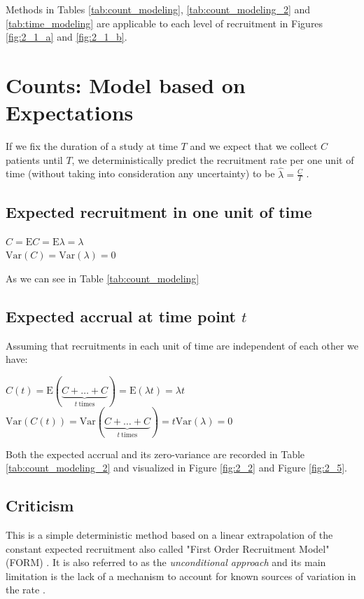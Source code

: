 Methods in Tables \ref{tab:count_modeling}, \ref{tab:count_modeling_2} and \ref{tab:time_modeling} are applicable to each level of recruitment in Figures \ref{fig:2_1_a} and \ref{fig:2_1_b}.


\section{Counts: Model based on Expectations}
\label{sec:expect}

If we fix the duration of a study at time $T$ and we expect that we collect $C$ patients until $T$, we deterministically predict the recruitment rate per one unit of time (without taking into consideration any uncertainty) to be $\hat{\lambda}=\frac{C}{T}$ \citep{carter2004application}.




\subsection{Expected recruitment in one unit of time}
$C = \textrm{E}C = \textrm{E}\lambda = \lambda$\\
$\textrm{Var}(C) = \textrm{Var}(\lambda) = 0$

As we can see in Table \ref{tab:count_modeling}

\subsection{Expected accrual at time point $t$}

Assuming that recruitments in each unit of time are independent of each other we have:

$C(t) = \textrm{E}(\underbrace{C+\ldots+C}_{t \ \text{times}}) = \textrm{E}(\lambda t) = \lambda t$\\
$\textrm{Var}(C(t)) = \textrm{Var}(\underbrace{C+\ldots+C}_{t \ \text{times}}) = t \textrm{Var}(\lambda) = 0$

Both the expected accrual and its zero-variance are recorded in Table \ref{tab:count_modeling_2}
and visualized in Figure \ref{fig:2_2} and Figure \ref{fig:2_5}.

\subsection{Criticism}

This is a simple deterministic method based on a linear extrapolation of the constant expected recruitment also called "First Order Recruitment Model" (FORM) \citep{comfort2013}. It is also referred to as the \textit{unconditional approach} and its main limitation is the lack of a mechanism to account for known sources of variation in the rate \citep{carter2005practical}. 

